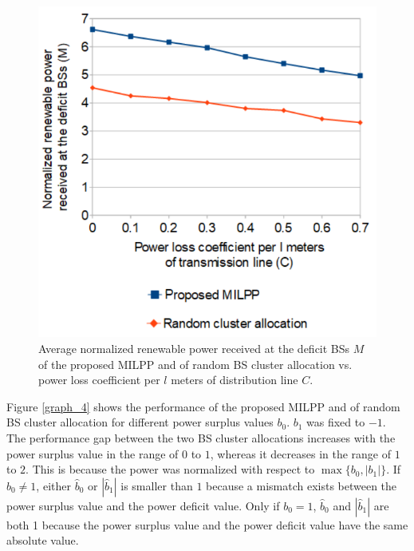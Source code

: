 \begin{figure}[H]
\centering
\includegraphics[width=0.75\columnwidth]{pictures/graph_3}
\caption{Average normalized renewable power received at the deficit BSs $M$ of the proposed MILPP and of random BS cluster allocation vs. power loss coefficient per $l$ meters of distribution line $C$.\label{graph_3}}
\end{figure}





Figure \ref{graph_4} shows the performance of the proposed MILPP and of random BS cluster allocation for different power surplus values $b_0$. $b_1$ was fixed to $-1$.
The performance gap between the two BS cluster allocations increases with the power surplus value in the range of $0$ to $1$, whereas it decreases in the range of $1$ to $2$. This is because the power was normalized with respect to $\max\{b_0,|b_1|\}$. If $b_0\neq 1$, either $\hat{b}_0$ or $|\hat{b}_1|$ is smaller than $1$ because a mismatch exists between the power surplus value  
and the power deficit value. Only if $b_0= 1$, $\hat{b}_0$ and $|\hat{b}_1|$ are both 1 because the power surplus value and the power deficit value have the same absolute value. 

